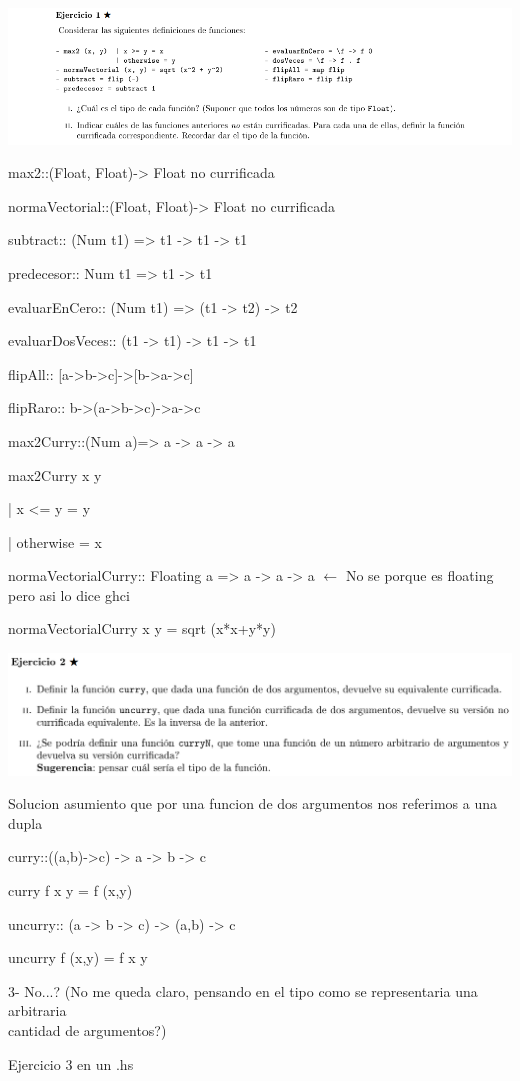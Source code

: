 \documentclass[a4,10pt]{article}
\begin{document}
\includegraphics[width=\linewidth]{img/ejercicio1.png}

max2::(Float, Float)-> Float \hfill no currificada

normaVectorial::(Float, Float)-> Float \hfill no currificada

subtract:: (Num t1) => t1 -> t1 -> t1

predecesor:: Num t1 => t1 -> t1

evaluarEnCero:: (Num t1) => (t1 -> t2) -> t2

evaluarDosVeces:: (t1 -> t1) -> t1 -> t1

flipAll:: [a->b->c]->[b->a->c]

flipRaro:: b->(a->b->c)->a->c

\vspace*{20px}

max2Curry::(Num a)=> a -> a -> a

max2Curry x y

    |   x <= y = y

    |   otherwise = x   

\vspace*{20px}

normaVectorialCurry:: Floating a => a -> a -> a \hfill {\color{purple}$\longleftarrow$ No se porque es floating pero asi lo dice ghci}

normaVectorialCurry x y = sqrt (x*x+y*y)

\vspace*{10px}

\includegraphics[width=\textwidth]{img/ejercicio2.png}

{\color{red}{\LARGE!!!} Solucion asumiento que por una funcion de dos argumentos nos referimos a una dupla}

\vspace*{\baselineskip}

curry::((a,b)->c) -> a -> b -> c

curry f x y = f (x,y)

\vspace*{\baselineskip}

uncurry:: (a -> b -> c) -> (a,b) -> c

uncurry f (x,y) = f x y

3- No...? (No me queda claro, pensando en el tipo como se representaria una arbitraria\\ cantidad de argumentos?)

Ejercicio 3 en un .hs
\end{document}
